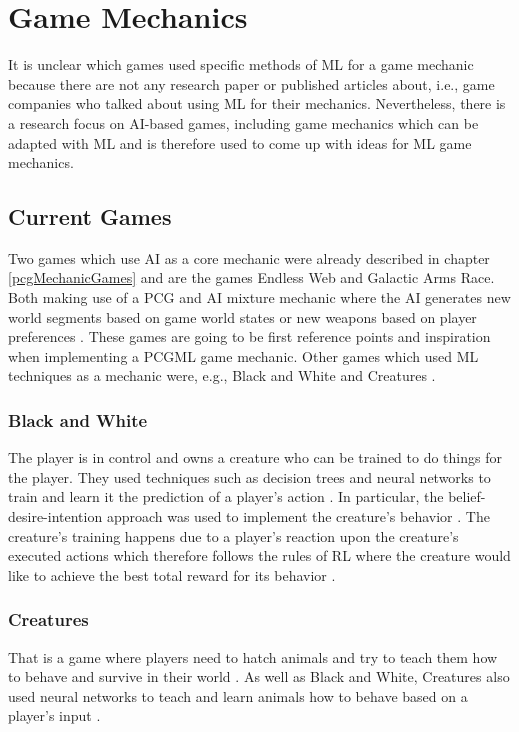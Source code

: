 \documentclass[MGS,Master,english]{twbook}%
\begin{document}
\section{Game Mechanics}
It is unclear which games used specific methods of ML for a game mechanic because there are not any research paper or published articles about, i.e., game companies who talked about using ML for their mechanics. Nevertheless, there is a research focus on AI-based games, including game mechanics which can be adapted with ML and is therefore used to come up with ideas for ML game mechanics. 

\subsection{Current Games}
Two games which use AI as a core mechanic were already described in chapter \ref{pcgMechanicGames} and are the games Endless Web and Galactic Arms Race. Both making use of a PCG and AI mixture mechanic where the AI generates new world segments based on game world states \cite{pcg::endlessWeb} or new weapons based on player preferences \cite{pcg::galacticArmsRace}. These games are going to be first reference points and inspiration when implementing a PCGML game mechanic. Other games which used ML techniques as a mechanic were, e.g., Black and White and Creatures \cite{ml::mostInfluentalAiGames}. 

\subsubsection{Black and White}
The player is in control and owns a creature who can be trained to do things for the player. They used techniques such as decision trees and neural networks to train and learn it the prediction of a player's action \cite{ml::gamasutra::ml} \cite{ml::mostInfluentalAiGames}. In particular, the belief-desire-intention approach was used to implement the creature's behavior \cite{ml::mostInfluentalAiGames}. The creature's training happens due to a player’s reaction upon the creature's executed actions which therefore follows the rules of RL where the creature would like to achieve the best total reward for its behavior \cite{ml::gamasutra::ml}.

\subsubsection{Creatures}
That is a game where players need to hatch animals and try to teach them how to behave and survive in their world \cite{ml::mostInfluentalAiGames}. As well as Black and White, Creatures also used neural networks to teach and learn animals how to behave based on a player's input \cite{ml::mostInfluentalAiGames}.
\end{document}
